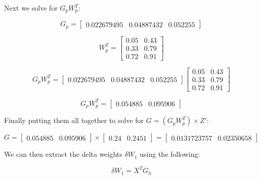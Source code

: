 \documentclass[a4paper]{article}
\begin{document}
Next we solve for $G_{p}W_{p}^T$:

\begin{equation}
  G_{p}=
    \begin{bmatrix}
      0.022679495 & 0.04887432 & 0.052255
    \end{bmatrix}
\end{equation}

\begin{equation}
  W_{p}^T=
    \begin{bmatrix}
      0.05 & 0.43 \\
      0.33 & 0.79 \\
      0.72 & 0.91
    \end{bmatrix}
\end{equation}

\begin{equation}
  G_{p}W_{p}^T=
    \begin{bmatrix}
      0.022679495 & 0.04887432 & 0.052255
    \end{bmatrix}
    \begin{bmatrix}
      0.05 & 0.43 \\
      0.33 & 0.79 \\
      0.72 & 0.91
    \end{bmatrix}
\end{equation}

\begin{equation}
  G_{p}W_{p}^T=
    \begin{bmatrix}
      0.054885 & 0.095906
    \end{bmatrix}
\end{equation}

Finally putting them all together to solve for $G = (G_{p}W_{p}^T) \times Z'$:

\begin{equation}
  G=
    \begin{bmatrix}
      0.054885 & 0.095906
    \end{bmatrix}
    \times
    \begin{bmatrix}
      0.24 & 0.2451
    \end{bmatrix}
    =
    \begin{bmatrix}
      0.0131723757 & 0.02350658
    \end{bmatrix}
\end{equation}

We can then extract the delta weights $\delta{W_{1}}$ using the following:

\begin{equation}
  \delta{W_{1}} = X^TG_h
\end{equation}
\end{document}
